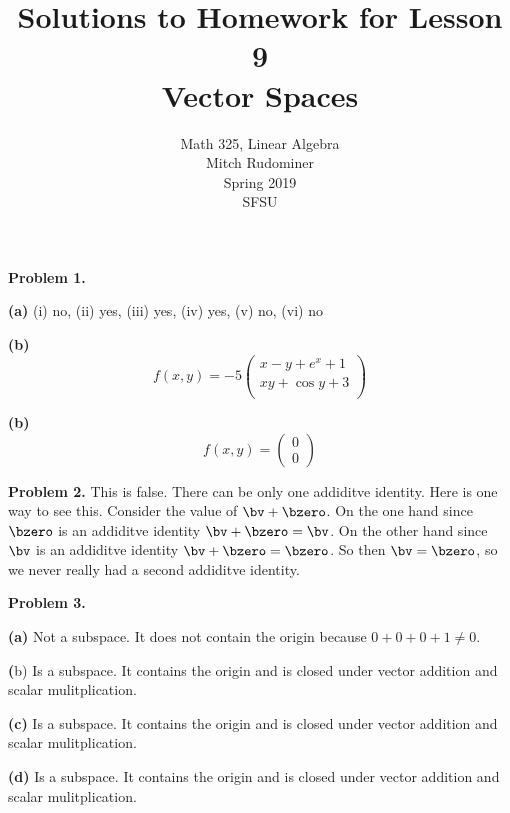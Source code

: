 \documentclass[oneside,12pt]{amsart}
\begin{document}
\title{Solutions to Homework for Lesson 9 \\ Vector Spaces}
\author{Math 325, Linear Algebra \\ Mitch Rudominer \\ Spring 2019 \\ SFSU }
\date{}

\maketitle


\textbf{Problem 1.}

\smallskip

\textbf{(a)} (i) no, (ii) yes, (iii) yes, (iv) yes, (v) no, (vi) no

\smallskip

\textbf{(b)}
$$f(x,y) =
-5
\begin{pmatrix}
x - y + e^x  + 1 \\
xy + \cos y + 3 \\
\end{pmatrix}
$$

\smallskip

\textbf{(b)}
$$f(x,y) =
\begin{pmatrix}
0 \\ 0
\end{pmatrix}
$$


\textbf{Problem 2.}  This is false. There can be only one addiditve identity. Here
is one way to see this. Consider the value of $\bv + \bzero$. On the one
hand since $\bzero$ is an addiditve identity $\bv + \bzero = \bv$.
On the other hand since $\bv$ is an addiditve identity $\bv + \bzero = \bzero$.
So then $\bv=\bzero$, so we never really had a second addiditve identity.

\medskip

\textbf{Problem 3.}

\smallskip

\textbf{(a)} Not a subspace. It does not contain the origin because
$0+0+0+1\not=0$.

\smallskip

\textbf({b}) Is a subspace. It contains the origin and is closed under
vector addition and scalar mulitplication.

\smallskip

\textbf{(c)} Is a subspace. It contains the origin and is closed under
vector addition and scalar mulitplication.

\smallskip

\textbf{(d)} Is a subspace. It contains the origin and is closed under
vector addition and scalar mulitplication.
\end{document}
